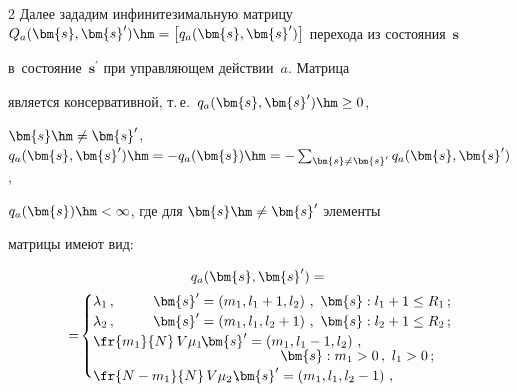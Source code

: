 \begin{multicols}{2}
  Далее зададим инфинитезимальную матрицу $Q_a(\bm{s},\bm{s}^\prime) 


\hm= \left[ q_a (\bm{s},\bm{s}^\prime)\right]$ перехода из состояния~$\bm{s}$ 


в~состояние~$\bm{s}^\prime$ при управляющем действии~$a$. Матрица 


является консервативной, т.\,е.\ $q_a(\bm{s},\bm{s}^\prime) \hm\geq0$, 


$\bm{s}\hm\not= \bm{s}^\prime$, $q_a(\bm{s},\bm{s}^\prime) \hm= -q_a(\bm{s})\hm= -


\sum\nolimits_{\bm{s}\not= \bm{s}^\prime} q_a (\bm{s},\bm{s}^\prime)$, 


$q_a(\bm{s})\hm<\infty$, где для $\bm{s}\hm\not= \bm{s}^\prime$ элементы 


матрицы имеют вид:





\pagebreak





\noindent


  \begin{multline*}


  q_a(\bm{s},\bm{s}^\prime) = {}\\


  {}\!=\!\begin{cases}


  \lambda_1\,, & \hspace*{-25mm}\bm{s}^\prime=\left( m_1,l_1+1,l_2\right)\,,\ \bm{s}: l_1+1\leq 


R_1\,;\\


  \lambda_2\,, & \hspace*{-25mm}\bm{s}^\prime=\left( m_1,l_1,l_2+1\right)\,,\ \bm{s}: l_2+1\leq 


R_2\,;\\


  \fr{m_1}{N}\,V\mu_1\,, & \hspace*{-13mm}\bm{s}^\prime=\left( m_1,l_1-1,l_2\right)\,,\\[-4pt]


  & \hspace*{7mm}\bm{s}:  m_1>0\,,\ l_1>0\,;\\


  \fr{N-m_1}{N}\,V\mu_2\,, & \hspace*{-5mm}\bm{s}^\prime=\left( m_1,l_1,l_2-1\right)\,,\\[-4pt]



\end{cases}
\end{multline*}
\end{multicols}
